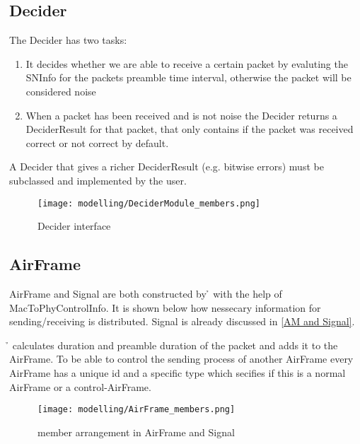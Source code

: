 \subsection{Decider}

The Decider has two tasks:
\begin{enumerate}
	\item It decides whether we are able to receive a certain packet by evaluting
	the SNInfo for the packets preamble time interval, otherwise the packet will 	be considered noise
	\item When a packet has been received and is not noise the Decider 	returns a DeciderResult for that packet, that only contains if the packet was received correct or not correct by default.
\end{enumerate}

A Decider that gives a richer DeciderResult (e.g. bitwise errors) must be subclassed and implemented by the user.

\begin{figure}[H]
 \centering
 \texttt{[image: modelling/DeciderModule\_members.png]}
 \caption{Decider interface}
 \label{fig: Decider interface}
\end{figure}


\subsection{AirFrame}
\label{AirFrame and Signal}

AirFrame and Signal are both constructed by \h{\bp} with the help of MacToPhyControlInfo.
It is shown below how nessecary information for sending/receiving is distributed. Signal is already discussed in \ref{AM and Signal}.

\h{\bp} calculates duration and preamble duration of the packet and adds it to the AirFrame. 
To be able to control the sending process of another AirFrame every AirFrame has a unique id and a specific type which secifies if this is a normal AirFrame or a control-AirFrame.


\begin{figure}[H]
 \centering
 \texttt{[image: modelling/AirFrame\_members.png]}
 \caption{member arrangement in AirFrame and Signal}
 \label{fig: member AirFrame}
\end{figure}



